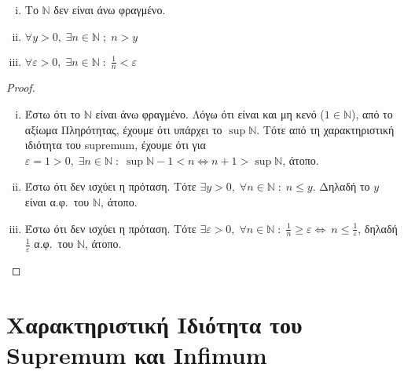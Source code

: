 \begin{mybox3}
\begin{prop}
  \mbox{}
  \begin{enumerate}[(i)]
    \item Το $ \mathbb{N} $ δεν είναι άνω φραγμένο.
    \item $ \forall y > 0, \; \exists n \in \mathbb{N} \; ; \; n > y$
    \item $ \forall \varepsilon >0, \; \exists n \in \mathbb{N} \; : 
      \; \frac{1}{n} < \varepsilon$
  \end{enumerate}
\end{prop}
\end{mybox3}
\begin{proof}
\item {}
  \begin{enumerate}[(i)]
    \item Έστω ότι το $ \mathbb{N} $ είναι άνω φραγμένο. Λόγω ότι 
      είναι και μη κενό ($ 1 \in \mathbb{N} $), από το αξίωμα 
      Πληρότητας, έχουμε ότι υπάρχει το $ \sup \mathbb{N} $. 
      Τότε από τη χαρακτηριστική ιδιότητα του supremum, έχουμε 
      ότι για $ \varepsilon = 1 >0, \; \exists n \in \mathbb{N} 
      \; : \; \sup \mathbb{N}-1 < n \Leftrightarrow n+1 > \sup
      \mathbb{N} $, άτοπο.

    \item Έστω ότι δεν ισχύει η πρόταση. Τότε  $ \exists y >0, \; 
      \forall n \in \mathbb{N} \; : \; n \leq y$. Δηλαδή
      το  $y$  είναι α.φ.\ του $\mathbb{N}$, άτοπο.

    \item Έστω ότι δεν ισχύει η πρόταση. Τότε $ \exists 
      \varepsilon >0 , \; \forall n \in \mathbb{N} \; : \; 
      \frac{1}{n} \geq \varepsilon  \Leftrightarrow \ n \leq 
      \frac{1}{\varepsilon} $, δηλαδή $ \frac{1}{\varepsilon} $ 
      α.φ.\ του $ \mathbb{N} $, άτοπο. 
  \end{enumerate}
\end{proof}

\section{Χαρακτηριστική Ιδιότητα του Supremum και Infimum}

